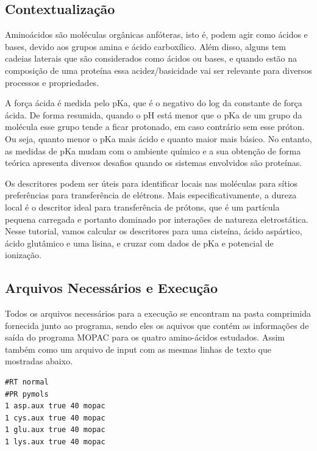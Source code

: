 \documentclass[a4paper,11pt]{refart}
\begin{document}
\subsection{Contextualização}

Aminoácidos são moléculas orgânicas anfóteras, isto é, podem agir como ácidos e bases, devido aos grupos amina e ácido carboxílico. Além disso, alguns tem cadeias laterais que são considerados como ácidos ou bases, e quando estão na composição de uma proteína essa acidez/basicidade vai ser relevante para diversos processos e propriedades.

A força ácida é medida pelo pKa, que é o negativo do log da constante de força ácida. De forma resumida, quando o pH está menor que o pKa de um grupo da molécula esse grupo tende a ficar protonado, em caso contrário sem esse próton. Ou seja, quanto menor o pKa mais ácido e quanto maior mais básico. No entanto, as medidas de pKa mudam com o ambiente químico e a sua obtenção de forma teórica apresenta diversos desafios quando os sistemas envolvidos são proteínas.

Os descritores podem ser úteis para identificar locais nas moléculas para sítios preferências para transferência de elétrons. Mais especificativamente, a dureza local é o descritor ideal para transferência de prótons, que é um partícula pequena carregada e portanto dominado por interações de natureza eletrostática. Nesse tutorial, vamos calcular os descritores para uma cisteína, ácido aspártico, ácido glutâmico e uma lisina, e cruzar com dados de pKa e potencial de ionização.


\subsection{Arquivos Necessários e Execução}

Todos os arquivos necessários para a execução se encontram na pasta comprimida fornecida junto ao programa, sendo eles os aquivos que contém as informações de saída do programa MOPAC para os quatro amino-ácidos estudados. Assim também como um arquivo de input com as mesmas linhas de texto que mostradas abaixo. 

\hspace*{-\leftmarginwidth}
\begin{minipage}{\fullwidth}
\begin{lstlisting}[caption={Input editado para execução do tutorial 3},label={tut402}]
#RT normal 
#PR pymols
1 asp.aux true 40 mopac
1 cys.aux true 40 mopac
1 glu.aux true 40 mopac
1 lys.aux true 40 mopac
\end{lstlisting}
\end{minipage}
\end{document}
